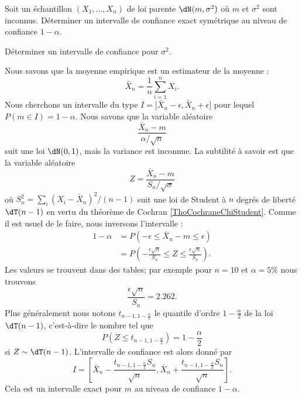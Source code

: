 \begin{example}
    
    Soit un échantillon \( (X_1,\ldots,X_n)\) de loi parente \( \dN(m,\sigma^2)\) où \( m\) et \( \sigma^2\) sont inconnus. Déterminer un intervalle de confiance exact symétrique au niveau de confiance \( 1-\alpha\).

    Déterminer un intervalle de confiance pour \( \sigma^2\).

    Nous savons que la moyenne empirique est un estimateur de la moyenne :
    \begin{equation}
        \bar X_n=\frac{1}{ n }\sum_{i=1}^nX_i.
    \end{equation}
    Nous cherchons un intervalle du type \( I=\mathopen[ \bar X_n-\epsilon , \bar X_n+\epsilon \mathclose]\) pour lequel \( P(m\in I)=1-\alpha\). Nous savons que la variable aléatoire
    \begin{equation}
        \frac{ \bar X_n-m }{ \alpha/\sqrt{n} }
    \end{equation}
    suit une loi \( \dN(0,1)\), mais la variance est inconnue. La subtilité à savoir est que la variable aléatoire
    \begin{equation}
        Z=\frac{ \bar X_n-m }{ S_n/\sqrt{\sigma} }
    \end{equation}
    où \( S_n^2=\sum_i(X_i-\bar X_n)^2/(n-1)\) suit une loi de Student à \( n\) degrés de liberté \( \dT(n-1)\) en vertu du théorème de Cochran \ref{ThoCochraneChiStudent}. Comme il est usuel de le faire, nous inversons l'intervalle :
    \begin{subequations}
        \begin{align}
            1-\alpha&=P\left( -\epsilon\leq \bar X_n-m\leq \epsilon \right)\\
            &=P\left( -\frac{ \epsilon\sqrt{n} }{ S_n }\leq Z\leq \frac{ \epsilon\sqrt{n} }{ S_n } \right).
        \end{align}
    \end{subequations}
    Les valeurs se trouvent dans des tables; par exemple pour \( n=10\) et \( \alpha=5\%\) nous trouvons
    \begin{equation}
        \frac{ \epsilon\sqrt{n} }{ S_n }=2.262.
    \end{equation}
    Plus généralement nous notons \( t_{n-1,1-\frac{ \alpha }{2}}\) le quantile d'ordre \( 1-\frac{ \alpha }{2}\) de la loi \( \dT(n-1)\), c'est-à-dire le nombre tel que
    \begin{equation}
        P(Z\leq t_{n-1,1-\frac{ \alpha }{2}})=1-\frac{ \alpha }{2}
    \end{equation}
    si \( Z\sim\dT(n-1)\). L'intervalle de confiance est alors donné par
    \begin{equation}
        I=\left[ \bar X_n-\frac{ t_{n-1,1-\frac{ \alpha }{2}}S_n }{ \sqrt{n} },\bar X_n+\frac{ t_{n-1,1-\frac{ \alpha }{2}}S_n }{ \sqrt{n} } \right].
    \end{equation}
    Cela est un intervalle exact pour \( m\) au niveau de confiance \( 1-\alpha\).


\end{example}
